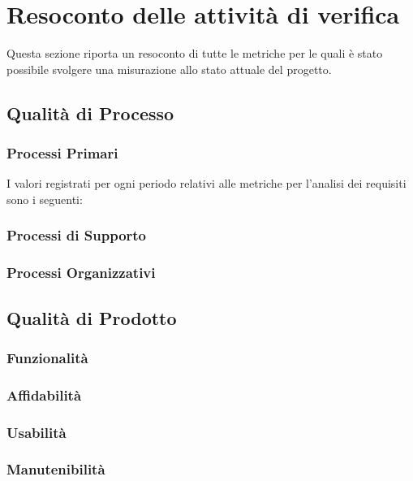 \section{Resoconto delle attività di verifica}
	Questa sezione riporta un resoconto di tutte le metriche per le quali è stato possibile svolgere una misurazione allo stato attuale del progetto.

	\subsection{Qualità di Processo}
		\subsubsection{Processi Primari}		%
				I valori registrati per ogni periodo relativi alle metriche per l'analisi dei requisiti sono i seguenti:
				
				
				
		
		\subsubsection{Processi di Supporto}	%
				
				
				
		
		\pagebreak		
		\subsubsection{Processi Organizzativi}	%
				
			
	\subsection{Qualità di Prodotto}			%
		\subsubsection{Funzionalità}
			
		\subsubsection{Affidabilità}
			
		\subsubsection{Usabilità}
			
		\subsubsection{Manutenibilità}
			
			


